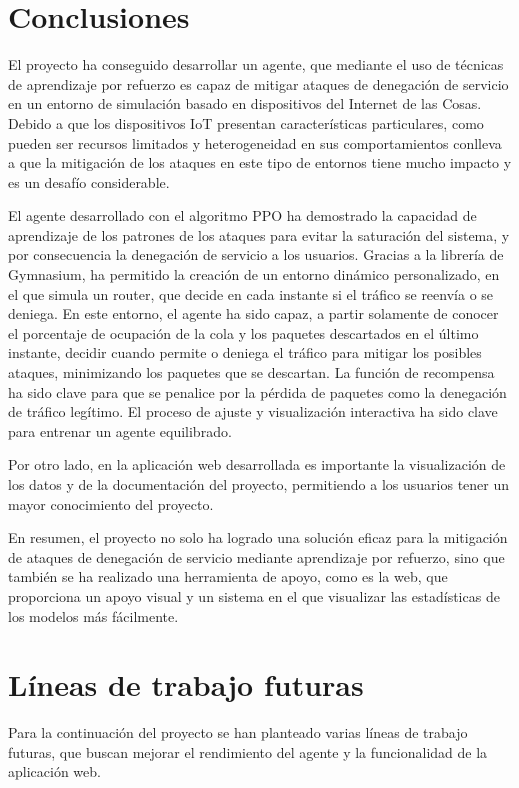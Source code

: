 
\section{Conclusiones}
El proyecto ha conseguido desarrollar un agente, que mediante el uso de técnicas de aprendizaje por refuerzo es capaz de mitigar ataques de denegación de servicio en un entorno de simulación basado en dispositivos  del Internet de las Cosas. Debido a que los dispositivos IoT presentan características particulares, como pueden ser recursos limitados y heterogeneidad en sus comportamientos conlleva a que la mitigación de los ataques en este tipo de entornos tiene mucho impacto y es un desafío considerable.

El agente desarrollado con el algoritmo PPO ha demostrado la capacidad de aprendizaje de los patrones de los ataques para evitar la saturación del sistema, y por consecuencia la denegación de servicio a los usuarios. Gracias a la librería de Gymnasium, ha permitido la creación de un entorno dinámico personalizado, en el que simula un router, que decide en cada instante si el tráfico se reenvía o se deniega. En este entorno, el agente ha sido capaz, a partir solamente de conocer el porcentaje de ocupación de la cola y los paquetes descartados en el último instante, decidir cuando permite o deniega el tráfico para mitigar los posibles ataques, minimizando los paquetes que se descartan. La función de recompensa ha sido clave para que se penalice por la pérdida de paquetes como la denegación de tráfico legítimo. El proceso de ajuste y visualización interactiva ha sido clave para entrenar un agente equilibrado.

Por otro lado, en la aplicación web desarrollada es importante la visualización de los datos y de la documentación del proyecto, permitiendo a los usuarios tener un mayor conocimiento del proyecto.

En resumen, el proyecto no solo ha logrado una solución eficaz para la mitigación de ataques de denegación de servicio mediante aprendizaje por refuerzo, sino que también se ha realizado una herramienta de apoyo, como es la web, que proporciona un apoyo visual y un sistema en el que visualizar las estadísticas de los modelos más fácilmente.

\section{Líneas de trabajo futuras}
Para la continuación del proyecto se han planteado varias líneas de trabajo futuras, que buscan mejorar el rendimiento del agente y la funcionalidad de la aplicación web. 

